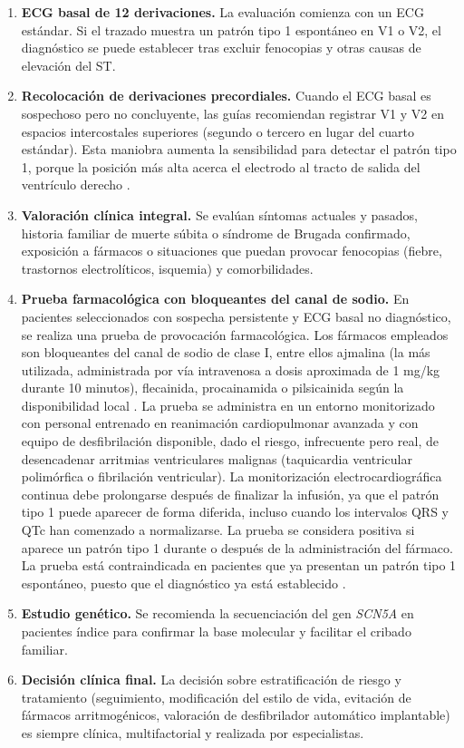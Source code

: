 \begin{enumerate}
  \item \textbf{ECG basal de 12 derivaciones.} La evaluación comienza con un ECG estándar. Si el trazado muestra un patrón tipo 1 espontáneo en V1 o V2, el diagnóstico se puede establecer tras excluir fenocopias y otras causas de elevación del ST.
  \item \textbf{Recolocación de derivaciones precordiales.} Cuando el ECG basal es sospechoso pero no concluyente, las guías recomiendan registrar V1 y V2 en espacios intercostales superiores (segundo o tercero en lugar del cuarto estándar). Esta maniobra aumenta la sensibilidad para detectar el patrón tipo 1, porque la posición más alta acerca el electrodo al tracto de salida del ventrículo derecho \cite{brugadadrugsdiagnostic}.
  \item \textbf{Valoración clínica integral.} Se evalúan síntomas actuales y pasados, historia familiar de muerte súbita o síndrome de Brugada confirmado, exposición a fármacos o situaciones que puedan provocar fenocopias (fiebre, trastornos electrolíticos, isquemia) y comorbilidades.
  \item \textbf{Prueba farmacológica con bloqueantes del canal de sodio.} En pacientes seleccionados con sospecha persistente y ECG basal no diagnóstico, se realiza una prueba de provocación farmacológica. Los fármacos empleados son bloqueantes del canal de sodio de clase I, entre ellos ajmalina (la más utilizada, administrada por vía intravenosa a dosis aproximada de 1 mg/kg durante 10 minutos), flecainida, procainamida o pilsicainida según la disponibilidad local \cite{wilde2023scbt}. La prueba se administra en un entorno monitorizado con personal entrenado en reanimación cardiopulmonar avanzada y con equipo de desfibrilación disponible, dado el riesgo, infrecuente pero real, de desencadenar arritmias ventriculares malignas (taquicardia ventricular polimórfica o fibrilación ventricular). La monitorización electrocardiográfica continua debe prolongarse después de finalizar la infusión, ya que el patrón tipo 1 puede aparecer de forma diferida, incluso cuando los intervalos QRS y QTc han comenzado a normalizarse. La prueba se considera positiva si aparece un patrón tipo 1 durante o después de la administración del fármaco. La prueba está contraindicada en pacientes que ya presentan un patrón tipo 1 espontáneo, puesto que el diagnóstico ya está establecido \cite{wilde2023scbt}.
  \item \textbf{Estudio genético.} Se recomienda la secuenciación del gen \emph{SCN5A} en pacientes índice para confirmar la base molecular y facilitar el cribado familiar.
  \item \textbf{Decisión clínica final.} La decisión sobre estratificación de riesgo y tratamiento (seguimiento, modificación del estilo de vida, evitación de fármacos arritmogénicos, valoración de desfibrilador automático implantable) es siempre clínica, multifactorial y realizada por especialistas.
\end{enumerate}

